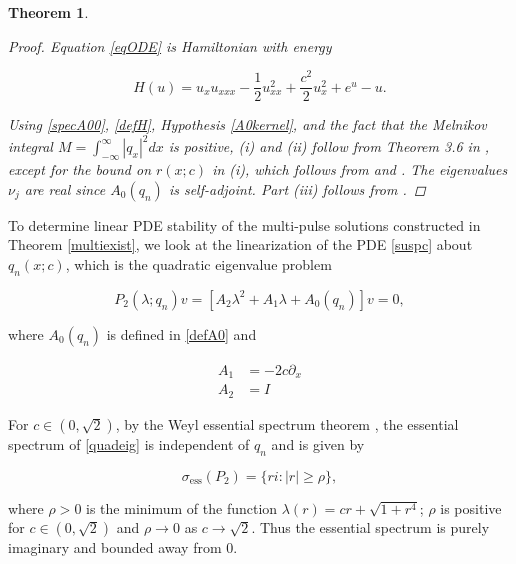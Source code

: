 \documentclass[12pt]{article}
\newtheorem{theorem}{Theorem}
\begin{document}
\begin{theorem}
\begin{enumerate}[(i)]
\end{enumerate}

\begin{proof}
Equation \eqref{eqODE} is Hamiltonian with energy

\begin{equation}\label{defH}
H(u) = u_x u_{xxx} - \frac{1}{2}u_{xx}^2 + \frac{c^2}{2}u_x^2 + e^u - u.
\end{equation}

Using \eqref{specA00}, \eqref{defH}, Hypothesis \ref{A0kernel}, and the fact that the Melnikov integral $M = \int_{-\infty}^\infty |q_x|^2 dx$ is positive, (i) and (ii) follow from Theorem 3.6 in \cite{Sandstede1997}, except for the bound on $r(x; c)$ in (i), which follows from \cite{Sanstede1993} and \cite{Sandstede1998}. The eigenvalues $\nu_j$ are real since $A_0(q_n)$ is self-adjoint. Part (iii) follows from \cite{Sandstede1998}.
\end{proof}
\end{theorem}

To determine linear PDE stability of the multi-pulse solutions constructed in Theorem \ref{multiexist}, we look at the linearization of the PDE \eqref{suspc} about $q_n(x; c)$, which is the quadratic eigenvalue problem

\begin{equation}\label{quadeig}
P_2(\lambda; q_n)v =  [A_2 \lambda^2 + A_1 \lambda + A_0(q_n)]v = 0,
\end{equation}

where $A_0(q_n)$ is defined in \eqref{defA0} and 

\begin{align}
A_1 &= -2 c \partial_x \\
A_2 &= I
\end{align}

For $c \in (0, \sqrt{2})$, by the Weyl essential spectrum theorem \cite[Theorem 2.2.6]{Kapitula2013}, the essential spectrum of \eqref{quadeig} is independent of $q_n$ and is given by

\begin{equation}\label{quadess}
\sigma_{\text{ess}}(P_2) = \{ r i : |r| \geq \rho \},
\end{equation}

where $\rho > 0$ is the minimum of the function $\lambda(r) = c r + \sqrt{1 + r^4}$; $\rho$ is positive for $c \in (0, \sqrt{2})$ and $\rho \rightarrow 0$ as $c \rightarrow \sqrt{2}$. Thus the essential spectrum is purely imaginary and bounded away from 0.\\
\end{document}
